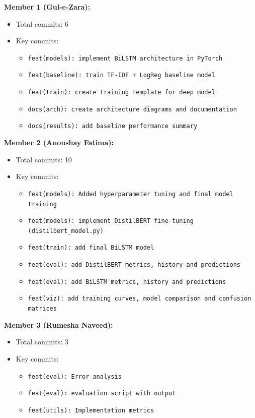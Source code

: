\documentclass[12pt,a4paper]{article}
\begin{document}
\textbf{Member 1 (Gul-e-Zara):}
\begin{itemize}
    \item Total commits: 6
    \item Key commits:
    \begin{itemize}
        \item \texttt{feat(models): implement BiLSTM architecture in PyTorch}
        \item \texttt{feat(baseline): train TF-IDF + LogReg baseline model}
        \item \texttt{feat(train): create training template for deep model}
        \item \texttt{docs(arch): create architecture diagrams and documentation}
        \item \texttt{docs(results): add baseline performance summary}
    \end{itemize}
\end{itemize}

\textbf{Member 2 (Anoushay Fatima):}
\begin{itemize}
    \item Total commits: 10
    \item Key commits:
    \begin{itemize}
        \item \texttt{feat(models): Added hyperparameter tuning and final model training}
        \item \texttt{feat(models): implement DistilBERT fine-tuning (distilbert\_model.py)}
        \item \texttt{feat(train): add final BiLSTM model}
        \item \texttt{feat(eval): add DistilBERT metrics, history and predictions}
        \item \texttt{feat(eval): add BiLSTM metrics, history and predictions}
        \item \texttt{feat(viz): add training curves, model comparison and confusion matrices}
    \end{itemize}
\end{itemize}

\textbf{Member 3 (Rumesha Naveed):}
\begin{itemize}
    \item Total commits: 3
    \item Key commits:
    \begin{itemize}
        \item \texttt{feat(eval): Error analysis}
        \item \texttt{feat(eval): evaluation script with output}
        \item \texttt{feat(utils): Implementation metrics}
    \end{itemize}
\end{itemize}
\end{document}
